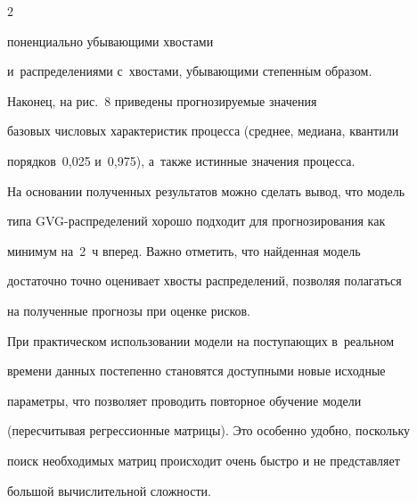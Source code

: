 \begin{multicols}{2}
\addtocounter{figure}{1}








\noindent


поненциально убывающими хвостами 


и~распределениями с~хвостами, убывающими степенн$\acute{\mbox{ы}}$м образом.














Наконец, на рис.~8 приведены прогнозируемые значения


базовых числовых характеристик процесса (среднее, медиана, квантили


порядков~0,025 и~0,975), а~также истинные значения процесса.








На основании полученных результатов можно сделать вывод, что модель


типа GVG-рас\-пре\-де\-лений хорошо подходит для прогнозирования как


минимум на~2~ч вперед. Важно отметить, что найден\-ная модель


достаточно точно оценивает хвос\-ты распределений, позволяя полагаться


на полученные прогнозы при оценке рисков.





При практическом использовании модели на поступающих в~реальном


времени данных постепенно становятся доступными новые исходные


параметры, что позволяет проводить повторное обуче\-ние модели


(пересчитывая регрессионные мат\-ри\-цы). Это особенно удобно, поскольку


поиск необходимых мат\-риц происходит очень быстро и не представляет


большой вычислительной слож\-ности.





{\small\frenchspacing


 {%




}}
\end{multicols}
